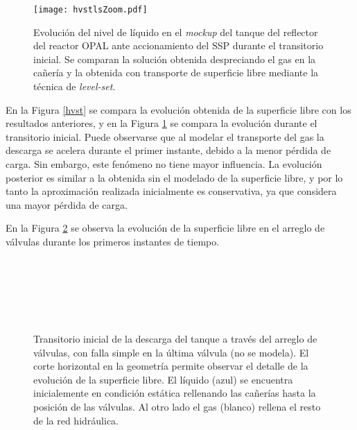 \begin{figure}[ht]
\centering
\texttt{[image: hvstlsZoom.pdf]}
\caption[Evolución del nivel de líquido en el \textit{mockup} del tanque del reflector del reactor OPAL ante accionamiento del SSP]
{Evolución del nivel de líquido en el \textit{mockup} del tanque del reflector del reactor OPAL ante accionamiento del SSP durante el transitorio inicial.
  Se comparan la solución obtenida despreciando el gas en la cañería y la obtenida con transporte de superficie libre mediante la técnica de \textit{level-set}.}  
	\label{hvstls}
\end{figure}

En la Figura \ref{hvst} se compara la evolución obtenida de la superficie libre con los resultados anteriores,
y en la Figura \ref{hvstls} se compara la evolución durante el transitorio inicial.
Puede observarse que al modelar el transporte del gas la descarga se acelera durante el primer instante, debido a la menor pérdida de carga.
Sin embargo, este fenómeno no tiene mayor influencia.
La evolución posterior es similar a la obtenida sin el modelado de la superficie libre,
y por lo tanto la aproximación realizada inicialmente es conservativa, ya que considera una mayor pérdida de carga.

En la Figura \ref{evol-ls} se observa la evolución de la superficie libre en el arreglo de válvulas durante los primeros instantes de tiempo.

\begin{figure}[ht]
\begin{minipage}[t]{.48\textwidth}
\centering
{}\\
\\
\end{minipage}\hfill
\begin{minipage}[t]{.48\textwidth}
\centering
{}\\
\\
\end{minipage}
\caption[Transitorio inicial de la descarga del tanque a través del arreglo de válvulas del \textit{mockup} del reactor OPAL, con detalle de la evolución de la superficie libre]
{Transitorio inicial de la descarga del tanque a través del arreglo de válvulas, con falla simple en la última válvula
  (no se modela).
	El corte horizontal en la geometría permite observar el detalle de la evolución de la superficie libre.
  El líquido (azul) se encuentra inicialemente en condición estática rellenando las cañerías hasta la posición de las válvulas.
  Al otro lado el gas (blanco) rellena el resto de la red hidráulica.}  
\label{evol-ls}
\end{figure}

